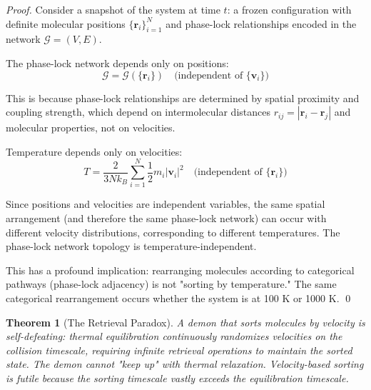 \documentclass[12pt,a4paper]{article}
\newtheorem{theorem}{Theorem}[section]
\theoremstyle{definition}
\theoremstyle{remark}
\newcommand{\phaselockgraph}{\mathcal{G}}
\begin{document}
\begin{proof}
Consider a snapshot of the system at time $t$: a frozen configuration with definite molecular positions $\{\mathbf{r}_i\}_{i=1}^N$ and phase-lock relationships encoded in the network $\phaselockgraph = (V, E)$.

The phase-lock network depends only on positions:
\begin{equation}
\phaselockgraph = \phaselockgraph(\{\mathbf{r}_i\}) \quad \text{(independent of } \{\mathbf{v}_i\})
\end{equation}

This is because phase-lock relationships are determined by spatial proximity and coupling strength, which depend on intermolecular distances $r_{ij} = |\mathbf{r}_i - \mathbf{r}_j|$ and molecular properties, not on velocities.

Temperature depends only on velocities:
\begin{equation}
T = \frac{2}{3 N k_B} \sum_{i=1}^{N} \frac{1}{2} m_i |\mathbf{v}_i|^2 \quad \text{(independent of } \{\mathbf{r}_i\})
\end{equation}

Since positions and velocities are independent variables, the same spatial arrangement (and therefore the same phase-lock network) can occur with different velocity distributions, corresponding to different temperatures. The phase-lock network topology is temperature-independent.

This has a profound implication: rearranging molecules according to categorical pathways (phase-lock adjacency) is not "sorting by temperature." The same categorical rearrangement occurs whether the system is at 100 K or 1000 K. \qed
\end{proof}

\begin{theorem}[The Retrieval Paradox]
\label{thm:retrieval_paradox}
A demon that sorts molecules by velocity is self-defeating: thermal equilibration continuously randomizes velocities on the collision timescale, requiring infinite retrieval operations to maintain the sorted state. The demon cannot "keep up" with thermal relaxation. Velocity-based sorting is futile because the sorting timescale vastly exceeds the equilibration timescale.
\end{theorem}
\end{document}

